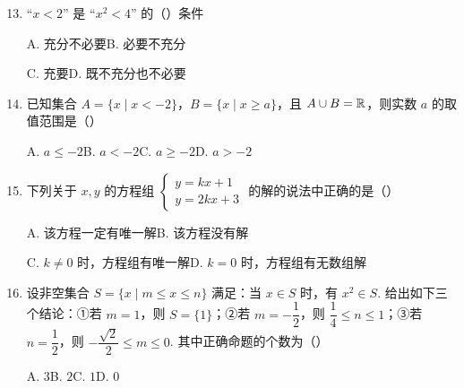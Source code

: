 \documentclass[a4paper,11pt]{article}
\begin{document}
\begin{enumerate}
\setcounter{enumi}{12}

\item “$x<2$” 是 “$x^2<4$” 的\mbox{（\quad）}条件

\keepwithprev
A. 充分不必要\qquad\qquad B. 必要不充分

C. 充要\qquad\qquad\qquad\quad D. 既不充分也不必要

\ifanswer
\solbegin
{}
\solend
\fi

\item 已知集合 $A=\{x\mid x<-2\}$，$B=\{x\mid x\geqslant a\}$，且 $A\cup B=\mathbb{R}$，则实数 $a$ 的取值范围是\mbox{（\quad）}

\keepwithprev
A. $a\leqslant-2$\qquad\qquad B. $a<-2$\qquad\qquad C. $a\geqslant-2$\qquad\qquad D. $a>-2$

\ifanswer
\solbegin
{}
\solend
\fi

\item 下列关于 $x,y$ 的方程组 $\begin{cases}y=kx+1\\y=2kx+3\end{cases}$ 的解的说法中正确的是\mbox{（\quad）}

\keepwithprev
A. 该方程一定有唯一解\qquad\qquad B. 该方程没有解

C. $k\neq0$ 时，方程组有唯一解\qquad\qquad D. $k=0$ 时，方程组有无数组解

\ifanswer
\solbegin
{}
\solend
\fi

\item 设非空集合 $S=\{x\mid m\leqslant x\leqslant n\}$ 满足：当 $x\in S$ 时，有 $x^2\in S$. 给出如下三个结论：①若 $m=1$，则 $S=\{1\}$；②若 $m=-\dfrac12$，则 $\dfrac14\leqslant n\leqslant1$；③若 $n=\dfrac12$，则 $-\dfrac{\sqrt2}{2}\leqslant m\leqslant0$. 其中正确命题的个数为\mbox{（\quad）}

\keepwithprev
A. $3$\qquad\qquad B. $2$\qquad\qquad C. $1$\qquad\qquad D. $0$


\end{enumerate}
\end{document}
